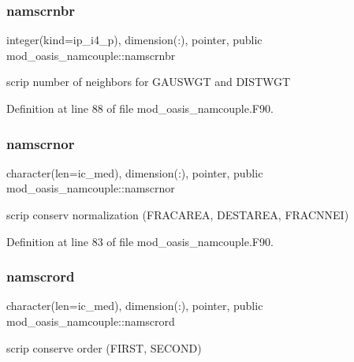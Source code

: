 \subsubsection{\texorpdfstring{namscrnbr}{namscrnbr}}
{\footnotesize\ttfamily integer(kind=ip\+\_\+i4\+\_\+p), dimension(\+:), pointer, public mod\+\_\+oasis\+\_\+namcouple\+::namscrnbr}



scrip number of neighbors for G\+A\+U\+S\+W\+GT and D\+I\+S\+T\+W\+GT 



Definition at line 88 of file mod\+\_\+oasis\+\_\+namcouple.\+F90.

\mbox{\label{namespacemod__oasis__namcouple_a392f40531007d5dcc084e6ad4a393fd7}} 
\subsubsection{\texorpdfstring{namscrnor}{namscrnor}}
{\footnotesize\ttfamily character(len=ic\+\_\+med), dimension(\+:), pointer, public mod\+\_\+oasis\+\_\+namcouple\+::namscrnor}



scrip conserv normalization (F\+R\+A\+C\+A\+R\+EA, D\+E\+S\+T\+A\+R\+EA, F\+R\+A\+C\+N\+N\+EI) 



Definition at line 83 of file mod\+\_\+oasis\+\_\+namcouple.\+F90.

\mbox{\label{namespacemod__oasis__namcouple_ac881ced105604879ada860fabd677481}} 
\subsubsection{\texorpdfstring{namscrord}{namscrord}}
{\footnotesize\ttfamily character(len=ic\+\_\+med), dimension(\+:), pointer, public mod\+\_\+oasis\+\_\+namcouple\+::namscrord}



scrip conserve order (F\+I\+R\+ST, S\+E\+C\+O\+ND) 



